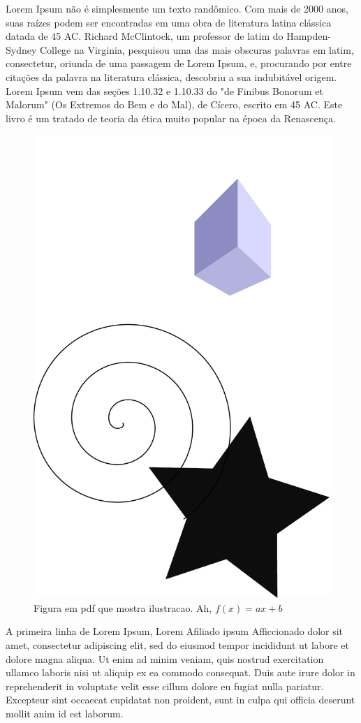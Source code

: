 \documentclass[a4, 12pt]{report}
\begin{document}
Lorem Ipsum não é simplesmente um
texto randômico. Com mais de 2000 anos, suas raízes podem ser
encontradas em uma obra de literatura latina clássica datada de 45
AC. Richard McClintock, um professor de latim do Hampden-Sydney
College na Virginia, pesquisou uma das mais obscuras palavras em
latim, consectetur, oriunda de uma passagem de Lorem Ipsum, e,
procurando por entre citações da palavra na literatura clássica,
descobriu a sua indubitável origem. Lorem Ipsum vem das seções 1.10.32
e 1.10.33 do "de Finibus Bonorum et Malorum" (Os Extremos do Bem e do
Mal), de Cícero, escrito em 45 AC. Este livro é um tratado de teoria
da ética muito popular na época da Renascença.

\begin{figure}[htb]
  \centering
  \includegraphics[width=0.3\linewidth]{drawing.pdf}
  \caption{Figura em pdf que mostra ilustracao. Ah, $f(x)=ax+b$}
  \label{fig:figpdf}
\end{figure}

A primeira linha de Lorem Ipsum, Lorem Afiliado ipsum Afficcionado
dolor sit amet, consectetur adipiscing elit, sed do eiusmod tempor
incididunt ut labore et dolore magna aliqua. Ut enim ad minim veniam,
quis nostrud exercitation ullamco laboris nisi ut aliquip ex ea
commodo consequat. Duis aute irure dolor in reprehenderit in voluptate
velit esse cillum dolore eu fugiat nulla pariatur. Excepteur sint
occaecat cupidatat non proident, sunt in culpa qui officia deserunt
mollit anim id est laborum.
\end{document}
